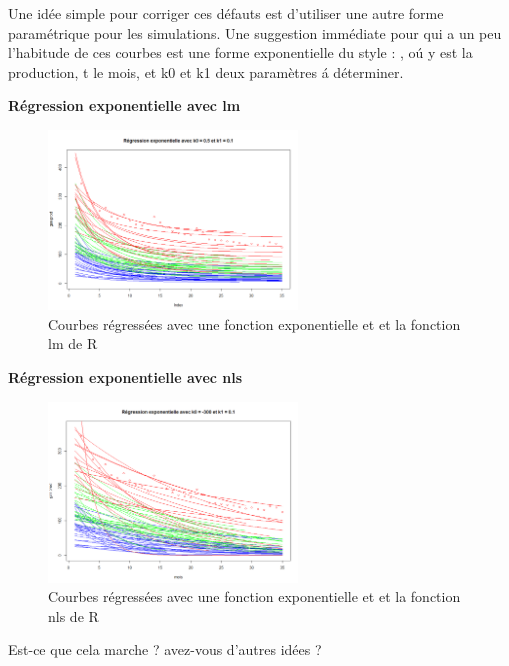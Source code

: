 \documentclass[12pt]{article}
\begin{document}
Une id\'ee simple pour corriger ces d\'efauts est d'utiliser une autre forme param\'etrique pour
les simulations. Une suggestion imm\'ediate pour qui a un peu l'habitude de ces courbes est
une forme exponentielle du style : , o\'u y est la production, t le mois, et k0 et
k1 deux param\`etres \'a d\'eterminer.

\textbf{R\'egression exponentielle avec lm}

\begin{figure}[H]
 \centering %
	\includegraphics[width=250px]{reg_exp_1}
  \caption{\label{fig:exponential_reg_lm} Courbes r\'egress\'ees avec une fonction exponentielle et et la fonction lm de R}
\end{figure}


\textbf{R\'egression exponentielle avec nls}

\begin{figure}[H]
 \centering %
	\includegraphics[width=250px]{reg_exp_2}
  \caption{\label{fig:exponential_reg_nls} Courbes r\'egress\'ees avec une fonction exponentielle et et la fonction nls de R}
\end{figure}

Est-ce que cela marche ? avez-vous d'autres id\'ees ?

\newpage
\end{document}
